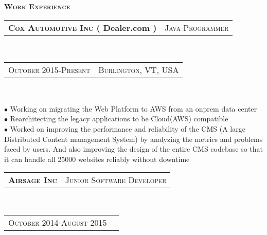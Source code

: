 \documentclass[10pt,a4paper,oneside]{article}
\begin{document}
    \begin{minipage}[t]{0.63\textwidth}
        \vspace{0pt}
        \textcolor{light-gray}{\textbf{\large W\textsc{ork} E\textsc{xperience}}}
        \vspace{10pt}\\
        \begin{tabular}{c|c}
            \textbf{\normalsize C\textsc{ox} A\textsc{utomotive} I\textsc{nc} ( Dealer.com )}
            &\textmd{\normalsize J\textsc{ava} P\textsc{rogrammer}}
        \end{tabular}\\
        \textcolor{light-gray}{
            \begin{tabular}{c|c}
                {\small O\textsc{ctober 2015}-P\textsc{resent}}
               &{\small B\textsc{urlington}, VT, USA}
            \end{tabular}
        }\\ 
        \vspace{-4mm}
        \begin{adjustwidth}{7pt}{0pt}
            {\footnotesize $\bullet$  Working on migrating the Web Platform to AWS from an onprem data center\\
            $\bullet$ Rearchitecting the legacy applications to be Cloud(AWS) compatible\\
        $\bullet$  Worked on improving the performance and reliability of the CMS (A large Distributed Content management System) by analyzing the metrics and problems faced by users. And also improving the design of the entire CMS codebase so that it can handle all 25000 websites reliably without downtime}\\
        \end{adjustwidth}
        \begin{tabular}{c|c}
            \textbf{\normalsize A\textsc{irsage} I\textsc{nc}}
            &\textmd{\normalsize J\textsc{unior} S\textsc{oftware} D\textsc{eveloper}}
        \end{tabular}\\
        \textcolor{light-gray}{
            \begin{tabular}{c|c}
                {\small O\textsc{ctober 2014}-A\textsc{ugust 2015}}

\end{tabular}}
\end{minipage}
\end{document}
